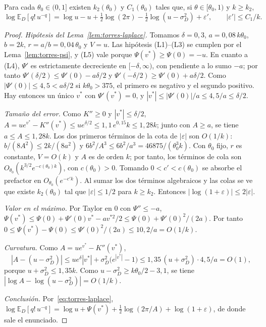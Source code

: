 \begin{proposicion}\label{prop:torres-laplace}
Para cada $\theta_0\in(0,1]$ existen $k_2(\theta_0)$ y $C_1(\theta_0)$ tales que, si $\theta\in[\theta_0,1)$
y
$k\ge k_2$,
\[
 \log\mathbb E_D[q!\,u^{-q}]=\log u-u+\tfrac12\log(2\pi)-\tfrac12\log(u-\sigma_D^2)+\varepsilon',\qquad
 |\varepsilon'|\le C_1/k.
\]
\end{proposicion}
\begin{proof}
\emph{Hipótesis del Lema~\ref{lem:torres-laplace}.} Tomamos $\delta=0{,}3$, $a=0{,}08\,k\theta_0$, $b=2k$,
$r=a/b=0{,}04\,\theta_0$ y $V=u$. Las hipótesis (L1)--(L3) se cumplen por el Lema~\ref{lem:torres-psi}, y
(L5) vale porque $\Psi(v^*)\ge\Psi(0)=-u$. En cuanto a (L4), $\Psi'$ es estrictamente decreciente en
$[-\delta,\infty)$, con pendiente a lo sumo $-a$; por tanto $\Psi'(\delta/2)\le\Psi'(0)-a\delta/2$ y
$\Psi'(-\delta/2)\ge\Psi'(0)+a\delta/2$. Como $|\Psi'(0)|\le4{,}5<a\delta/2$ si $k\theta_0>375$, el primero
es negativo y el segundo positivo. Hay entonces un único $v^*$ con $\Psi'(v^*)=0$, y
$|v^*|\le|\Psi'(0)|/a\le4{,}5/a\le\delta/2$.

\emph{Tamaño del error.} Como $K''\ge0$ y $|v^*|\le\delta/2$,
$A=ue^{v^*}-K''(v^*)\le ue^{\delta/2}\le1{,}1\,e^{0{,}15}k\le1{,}28k$; junto con $A\ge a$, se tiene
$a\le A\le1{,}28k$. Los dos primeros términos de la cota de $|\varepsilon|$ son $O(1/k)$:
$b/(8A^2)\le2k/(8a^2)$ y $6b^2/A^3\le6b^2/a^3=46875/(\theta_0^3k)$. Con $\theta_0$ fijo, $r$ es constante,
$V=O(k)$ y $A$ es de orden $k$; por tanto, los términos de cola son
$O_{\theta_0}(k^{3/2}e^{-c(\theta_0)k})$, con $c(\theta_0)>0$. Tomando $0<c'<c(\theta_0)$ se absorbe el
prefactor en $O_{\theta_0}(e^{-c'k})$. Al sumar los dos términos algebraicos y las colas se ve que existe
$k_2(\theta_0)$ tal que $|\varepsilon|\le1/2$ para $k\ge k_2$. Entonces
$|\log(1+\varepsilon)|\le2|\varepsilon|$.

\emph{Valor en el máximo.} Por Taylor en $0$ con $\Psi''\le-a$,
$\Psi(v^*)\le\Psi(0)+\Psi'(0)v^*-av^{*2}/2\le\Psi(0)+\Psi'(0)^2/(2a)$. Por tanto
$0\le\Psi(v^*)-\Psi(0)\le\Psi'(0)^2/(2a)\le10{,}2/a=O(1/k)$.

\emph{Curvatura.} Como $A=ue^{v^*}-K''(v^*)$,
\[
 |A-(u-\sigma_D^2)|\le
ue^{\delta}|v^*|+\sigma_D^2\bigl(e^{|v^*|}-1\bigr)\le1{,}35\,(u+\sigma_D^2)\cdot4{,}5/a=O(1),
\]
porque $u+\sigma_D^2\le1{,}35k$. Como $u-\sigma_D^2\ge k\theta_0/2-3{,}1$, se tiene
$|\log A-\log(u-\sigma_D^2)|=O(1/k)$.

\emph{Conclusión.} Por~\eqref{eq:torres-laplace},
$\log\mathbb E_D[q!\,u^{-q}]=\log u+\Psi(v^*)+\frac12\log(2\pi/A)+\log(1+\varepsilon)$, de donde sale el
enunciado.
\end{proof}

